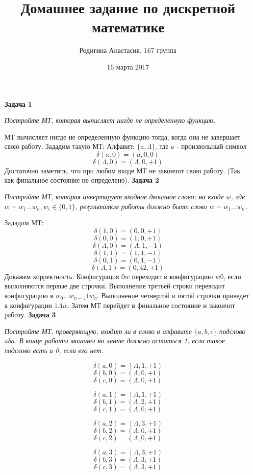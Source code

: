 \documentclass{article}
\title{Домашнее задание по дискретной математике}
\author{Родигина Анастасия, 167 группа}
\date{16 марта  2017}
\begin{document}
            

\maketitle  
 \noindent \textbf{Задача 1}
\begin{center} 
\textit{Постройте МТ, которая вычисляет нигде не определенную функцию.}
\end{center}
МТ вычисляет нигде не определенную функцию тогда, когда она не завершает свою работу. 
Зададим такую МТ:
Алфавит: $\{a,\Lambda\}$, где $a$ - произвольный символ
$$\delta(a,0)=(a,0,0)$$
$$\delta(\Lambda,0)=(\Lambda,0,+1)$$
Достаточно заметить, что при любом входе МТ не закончит свою работу. (Так как финальное состояние не определено).
\newline
\newline
\textbf{Задача 2}
\begin{center}
\textit{Постройте МТ, которая инвертирует входное двоичное слово: на входе $w$, где $w = w_1 . . . w_n, w_i \in
\{0, 1\}$, результатом работы должно быть слово $w = \overline{w}_1 . . . \overline{w}_n$.}
\end{center}
Зададим МТ:
$$\delta(1,0)=(0,0,+1)$$
$$\delta(0,0)=(1,0,+1)$$
$$\delta(\Lambda,0)=(\Lambda,1,-1)$$
$$\delta(1,1)=(1,1,-1)$$
$$\delta(0,1)=(0,1,-1)$$
$$\delta(\Lambda,1)=(0,42,+1)$$
 Докажем корректность. Конфигурация $0w$ переходит в конфигурацию $\overline{w}0$, если выполняются первые две строчки. Выполнение третьей строки переводит конфигурацию в $\overline{w}_0...\overline{w}_{n-1}1\overline{w}_n$. Выполнение четвертой и пятой строчки приведет к конфигурации $1\Lambda\overline{w}$. Затем МТ перейдет в финальное состояние и закончит работу.  
 \newline
 \newline
\textbf{Задача 3}
\begin{center}
\textit{Постройте МТ, проверяющую, входит ли в слово в алфавите $\{a, b, c\}$ подслово $aba$. В конце работы
машины на ленте должно остаться 1, если такое подслово есть и 0, если его нет.} 
\end{center}
$$\delta(a,0)=(\Lambda,1,+1)$$
$$\delta(b,0)=(\Lambda,0,+1)$$
$$\delta(c,0)=(\Lambda,0,+1)$$

$$\delta(a,1)=(\Lambda,1,+1)$$
$$\delta(b,1)=(\Lambda,2,+1)$$
$$\delta(c,1)=(\Lambda,0,+1)$$

$$\delta(a,2)=(\Lambda,3,+1)$$
$$\delta(b,2)=(\Lambda,0,+1)$$
$$\delta(c,2)=(\Lambda,0,+1)$$

$$\delta(a,3)=(\Lambda,3,+1)$$
$$\delta(b,3)=(\Lambda,3,+1)$$
$$\delta(c,3)=(\Lambda,3,+1)$$
\end{document}
